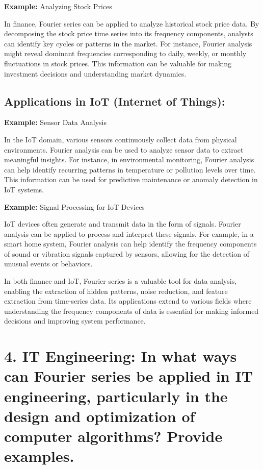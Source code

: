 \documentclass[11pt]{article}
\begin{document}
\textbf{Example:} Analyzing Stock Prices

In finance, Fourier series can be applied to analyze historical stock
price data. By decomposing the stock price time series into its
frequency components, analysts can identify key cycles or patterns in
the market. For instance, Fourier analysis might reveal dominant
frequencies corresponding to daily, weekly, or monthly fluctuations in
stock prices. This information can be valuable for making investment
decisions and understanding market dynamics.

\hypertarget{applications-in-iot-internet-of-things}{%
\subsection{Applications in IoT (Internet of
Things):}\label{applications-in-iot-internet-of-things}}

\textbf{Example:} Sensor Data Analysis

In the IoT domain, various sensors continuously collect data from
physical environments. Fourier analysis can be used to analyze sensor
data to extract meaningful insights. For instance, in environmental
monitoring, Fourier analysis can help identify recurring patterns in
temperature or pollution levels over time. This information can be used
for predictive maintenance or anomaly detection in IoT systems.

\textbf{Example:} Signal Processing for IoT Devices

IoT devices often generate and transmit data in the form of signals.
Fourier analysis can be applied to process and interpret these signals.
For example, in a smart home system, Fourier analysis can help identify
the frequency components of sound or vibration signals captured by
sensors, allowing for the detection of unusual events or behaviors.

In both finance and IoT, Fourier series is a valuable tool for data
analysis, enabling the extraction of hidden patterns, noise reduction,
and feature extraction from time-series data. Its applications extend to
various fields where understanding the frequency components of data is
essential for making informed decisions and improving system
performance.

    \hypertarget{it-engineering-in-what-ways-can-fourier-series-be-applied-in-it-engineering-particularly-in-the-design-and-optimization-of-computer-algorithms-provide-examples.}{%
\section{4. IT Engineering: In what ways can Fourier series be applied
in IT engineering, particularly in the design and optimization of
computer algorithms? Provide
examples.}\label{it-engineering-in-what-ways-can-fourier-series-be-applied-in-it-engineering-particularly-in-the-design-and-optimization-of-computer-algorithms-provide-examples.}}
\end{document}
